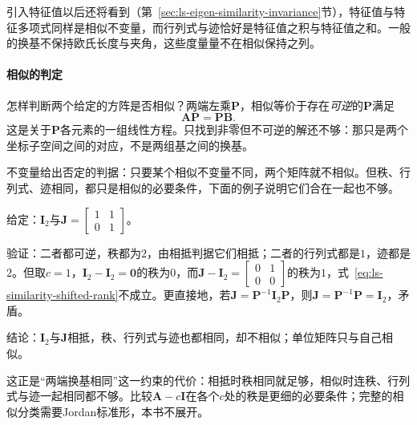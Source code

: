 引入特征值以后还将看到（第~\ref{sec:ls-eigen-similarity-invariance}节），特征值与特征多项式同样是相似不变量，而行列式与迹恰好是特征值之积与特征值之和。一般的换基不保持欧氏长度与夹角，这些度量量不在相似保持之列。

\paragraph{相似的判定}
\label{sec:ls-similarity-conditions}
怎样判断两个给定的方阵是否相似？两端左乘$\bm P$，相似等价于存在\emph{可逆}的$\bm P$满足
\begin{equation}
 \bm A\bm P=\bm P\bm B.
 \label{eq:ls-similarity-equation}
\end{equation}
这是关于$\bm P$各元素的一组线性方程。只找到非零但不可逆的解还不够：那只是两个坐标子空间之间的对应，不是两组基之间的换基。

不变量给出否定的判据：只要某个相似不变量不同，两个矩阵就不相似。但秩、行列式、迹相同，都只是相似的必要条件，下面的例子说明它们合在一起也不够。
\begin{example}[反例：相抵而不相似的两个矩阵]
\label{ex:ls-equivalent-not-similar}
给定：$\bm I_2$与$\bm J=\left[\begin{smallmatrix}1&1\\0&1\end{smallmatrix}\right]$。

验证：二者都可逆，秩都为$2$，由相抵判据它们相抵；二者的行列式都是$1$，迹都是$2$。但取$c=1$，$\bm I_2-\bm I_2=\bm0$的秩为$0$，而$\bm J-\bm I_2=\left[\begin{smallmatrix}0&1\\0&0\end{smallmatrix}\right]$的秩为$1$，式~\eqref{eq:ls-similarity-shifted-rank}不成立。更直接地，若$\bm J=\bm P^{-1}\bm I_2\bm P$，则$\bm J=\bm P^{-1}\bm P=\bm I_2$，矛盾。

结论：$\bm I_2$与$\bm J$相抵，秩、行列式与迹也都相同，却不相似；单位矩阵只与自己相似。
\end{example}
这正是“两端换基相同”这一约束的代价：相抵时秩相同就足够，相似时连秩、行列式与迹一起相同都不够。比较$\bm A-c\bm I$在各个$c$处的秩是更细的必要条件；完整的相似分类需要Jordan标准形，本书不展开。
